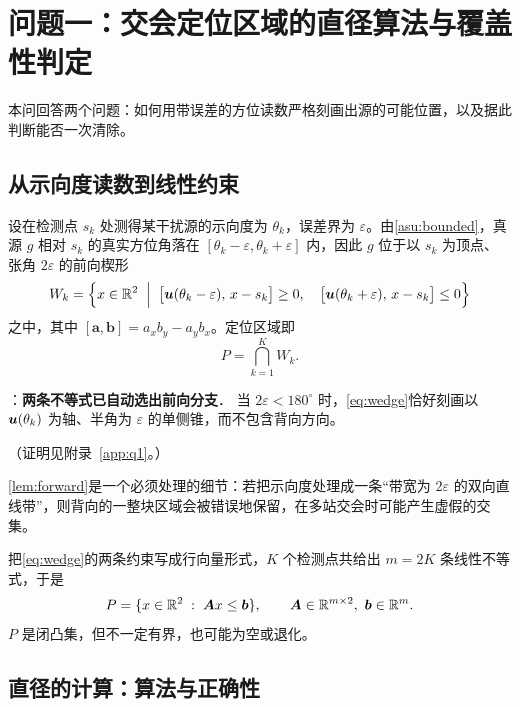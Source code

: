 \section{问题一：交会定位区域的直径算法与覆盖性判定}\label{sec:q1}

本问回答两个问题：如何用带误差的方位读数严格刻画出源的可能位置，以及据此判断能否一次清除。

\subsection{从示向度读数到线性约束}

设在检测点 $s_k$ 处测得某干扰源的示向度为 $\theta_k$，误差界为 $\varepsilon$。由\cref{asu:bounded}，真源 $g$ 相对 $s_k$ 的真实方位角落在 $[\theta_k-\varepsilon,\theta_k+\varepsilon]$ 内，因此 $g$ 位于以 $s_k$ 为顶点、张角 $2\varepsilon$ 的前向楔形
\begin{equation}\label{eq:wedge}
  W_k=\Bigl\{x\in\mathbb{R}^2 \;\Bigm|\; \bigl[\bm{u}(\theta_k-\varepsilon),\,x-s_k\bigr]\ge 0,\quad
                                  \bigl[\bm{u}(\theta_k+\varepsilon),\,x-s_k\bigr]\le 0\Bigr\}
\end{equation}
之中，其中 $[\bm a,\bm b]=a_xb_y-a_yb_x$。定位区域即
\begin{equation}\label{eq:P}
  P=\bigcap_{k=1}^{K} W_k .
\end{equation}

\begin{lemma}：\textbf{两条不等式已自动选出前向分支}．\label{lem:forward}
当 $2\varepsilon<180^\circ$ 时，\cref{eq:wedge}恰好刻画以 $\bm{u}(\theta_k)$ 为轴、半角为 $\varepsilon$ 的单侧锥，而不包含背向方向。
\end{lemma}

\noindent（证明见附录~\ref{app:q1}。）

\cref{lem:forward}是一个必须处理的细节：若把示向度处理成一条“带宽为 $2\varepsilon$ 的双向直线带”，则背向的一整块区域会被错误地保留，在多站交会时可能产生虚假的交集。

把\cref{eq:wedge}的两条约束写成行向量形式，$K$ 个检测点共给出 $m=2K$ 条线性不等式，于是
\begin{equation}\label{eq:poly}
  P=\{x\in\R^2 \;:\; \bm A x\le \bm b\},\qquad \bm A\in\R^{m\times2},\ \bm b\in\R^{m}.
\end{equation}
$P$ 是闭凸集，但不一定有界，也可能为空或退化。

\subsection{直径的计算：算法与正确性}

